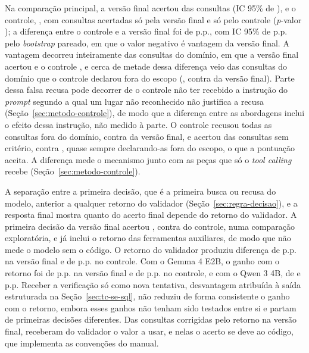 Na comparação principal, a versão final acertou  das consultas (IC 95\% de ), e o controle, , com  consultas acertadas só pela versão final e  só pelo controle (\textit{p}-valor ); a diferença entre o controle e a versão final foi de  p.p., com IC 95\% de  p.p. pelo \textit{bootstrap} pareado, em que o valor negativo é vantagem da versão final. A vantagem decorreu inteiramente das consultas do domínio, em que a versão final acertou  e o controle , e cerca de metade dessa diferença veio das consultas do domínio que o controle declarou fora do escopo (, contra  da versão final). Parte dessa falsa recusa pode decorrer de o controle não ter recebido a instrução do \textit{prompt} segundo a qual um lugar não reconhecido não justifica a recusa (Seção~\ref{sec:metodo-controle}), de modo que a diferença entre as abordagens inclui o efeito dessa instrução, não medido à parte. O controle recusou todas as consultas fora do domínio, contra  da versão final, e acertou  das consultas sem critério, contra , quase sempre declarando-as fora do escopo, o que a pontuação aceita. A diferença mede o mecanismo junto com as peças que só o \textit{tool calling} recebe (Seção~\ref{sec:metodo-controle}).

A separação entre a primeira decisão, que é a primeira busca ou recusa do modelo, anterior a qualquer retorno do validador (Seção~\ref{sec:regra-decisao}), e a resposta final mostra quanto do acerto final depende do retorno do validador. A primeira decisão da versão final acertou , contra  do controle, numa comparação exploratória, e já inclui o retorno das ferramentas auxiliares, de modo que não mede o modelo sem o código. O retorno do validador produziu diferença de  p.p. na versão final e de  p.p. no controle. Com o Gemma 4 E2B, o ganho com o retorno foi de  p.p. na versão final e de  p.p. no controle, e com o Qwen 3 4B, de  e  p.p. Receber a verificação só como nova tentativa, desvantagem atribuída à saída estruturada na Seção~\ref{sec:tc-se-sql}, não reduziu de forma consistente o ganho com o retorno, embora esses ganhos não tenham sido testados entre si e partam de primeiras decisões diferentes. Das consultas corrigidas pelo retorno na versão final,  receberam do validador o valor a usar, e nelas o acerto se deve ao código, que implementa as convenções do manual.

